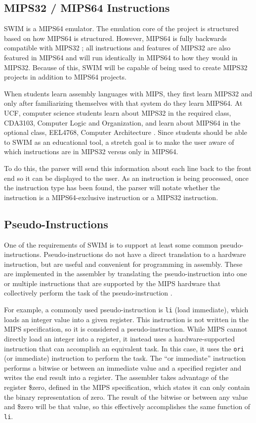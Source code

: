 \documentclass[
    paper=letter,
    parskip=half,
    fontsize=12pt,
    titlepage=firstiscover,
    toc=bibliography,
    numbers=endperiod
]{scrartcl}
\begin{document}
\subsection{MIPS32 / MIPS64 Instructions}

SWIM is a MIPS64 emulator. The emulation core of the project is
structured based on how MIPS64 is structured. However, MIPS64 is fully
backwards compatible with MIPS32 \cite{mips-specification}; all
instructions and features of MIPS32 are also featured in MIPS64 and will
run identically in MIPS64 to how they would in MIPS32. Because of this,
SWIM will be capable of being used to create MIPS32 projects in addition
to MIPS64 projects.

When students learn assembly languages with MIPS, they first learn
MIPS32 and only after familiarizing themselves with that system do they
learn MIPS64. At UCF, computer science students learn about MIPS32 in
the required class, CDA3103, Computer Logic and Organization, and learn
about MIPS64 in the optional class, EEL4768, Computer Architecture
\cite{ucf-cs-electives}. Since students should be able to SWIM as an
educational tool, a stretch goal is to make the user aware of which
instructions are in MIPS32 versus only in MIPS64.

To do this, the parser will send this information about each line back
to the front end so it can be displayed to the user. As an instruction
is being processed, once the instruction type has been found, the parser
will notate whether the instruction is a MIPS64-exclusive instruction or
a MIPS32 instruction.

\subsection{Pseudo-Instructions}

One of the requirements of SWIM is to support at least some common
pseudo-instructions. Pseudo-instructions do not have a direct
translation to a hardware instruction, but are useful and convenient for
programming in assembly. These are implemented in the assembler by
translating the pseudo-instruction into one or multiple instructions
that are supported by the MIPS hardware that collectively perform the
task of the pseudo-instruction \cite{koehn-pseudoinstructions}.

For example, a commonly used pseudo-instruction is \texttt{li} (load
immediate), which loads an integer value into a given register. This
instruction is not written in the MIPS specification, so it is
considered a pseudo-instruction. While MIPS cannot directly load an
integer into a register, it instead uses a hardware-supported
instruction that can accomplish an equivalent task. In this case, it
uses the \texttt{ori} (or immediate) instruction to perform the task.
The ``or immediate'' instruction performs a bitwise or between an
immediate value and a specified register and writes the end result into
a register. The assembler takes advantage of the register \$zero,
defined in the MIPS specification, which states it can only contain the
binary representation of zero. The result of the bitwise or between any
value and \$zero will be that value, so this effectively accomplishes
the same function of \texttt{li}.
\end{document}
